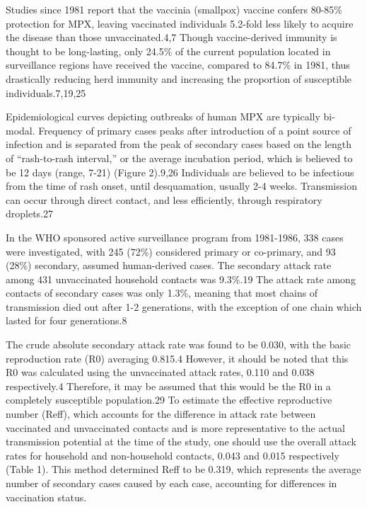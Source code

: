 Studies since 1981 report that the vaccinia (smallpox) vaccine confers 80-85\% protection for MPX, leaving vaccinated individuals 5.2-fold less likely to acquire the disease than those unvaccinated.4,7 Though vaccine-derived immunity is thought to be long-lasting, only 24.5\% of the current population located in surveillance regions have received the vaccine, compared to 84.7\% in 1981, thus drastically reducing herd immunity and increasing the proportion of susceptible individuals.7,19,25 

Epidemiological curves depicting outbreaks of human MPX are typically bi-modal. Frequency of primary cases peaks after introduction of a point source of infection and is separated from the peak of secondary cases based on the length of “rash-to-rash interval,” or the average incubation period, which is believed to be 12 days (range, 7-21) (Figure 2).9,26 Individuals are believed to be infectious from the time of rash onset, until desquamation, usually 2-4 weeks. Transmission can occur through direct contact, and less efficiently, through respiratory droplets.27 

In the WHO sponsored active surveillance program from 1981-1986, 338 cases were investigated, with 245 (72\%) considered primary or co-primary, and 93 (28\%) secondary, assumed human-derived cases. The secondary attack rate among 431 unvaccinated household contacts was 9.3\%.19 The attack rate among contacts of secondary cases was only 1.3\%, meaning that most chains of transmission died out after 1-2 generations, with the exception of one chain which lasted for four generations.8 

The crude absolute  secondary attack rate was found to be 0.030, with the basic reproduction rate (R0) averaging 0.815.4 However, it should be noted that this R0 was calculated using the unvaccinated attack rates, 0.110 and 0.038 respectively.4 Therefore, it may be assumed that this would be the R0 in a completely susceptible population.29 To estimate the effective reproductive number (Reff), which accounts for the difference in attack rate between vaccinated and unvaccinated contacts and is more representative to the actual transmission potential at the time of the study, one should use the overall attack rates for household and non-household contacts, 0.043 and 0.015 respectively (Table 1). This method determined Reff to be 0.319, which represents the average number of secondary cases caused by each case, accounting for differences in vaccination status. 


